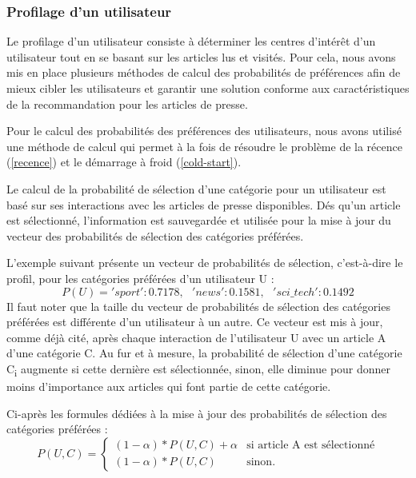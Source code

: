         \subsubsection{Profilage d'un utilisateur}\label{proba-selct}
        Le profilage d'un utilisateur consiste à déterminer les centres d'intérêt d'un utilisateur tout en se basant sur les articles lus et visités. Pour cela, nous avons mis en place plusieurs méthodes de calcul des probabilités de préférences afin de mieux cibler les utilisateurs et garantir une solution conforme aux caractéristiques de la recommandation pour les articles de presse. 

        Pour le calcul des probabilités des préférences des utilisateurs, nous avons utilisé une méthode de calcul qui permet à la fois de résoudre le problème de la récence (\autoref{recence}) et le démarrage à froid (\autoref{cold-start}).

        Le calcul de la probabilité de sélection d'une catégorie pour un utilisateur est basé sur ses interactions avec les articles de presse disponibles. Dés qu'un article est sélectionné, l'information est sauvegardée et utilisée pour la mise à jour du vecteur des probabilités de sélection des catégories préférées.

        L'exemple suivant présente un vecteur de probabilités de sélection, c'est-à-dire le profil, pour les catégories préférées d'un utilisateur U :
            \[P(U) = {'sport': 0.7178,\text{ }'news': 0.1581,\text{ }'sci\_tech': 0.1492}\]            
        Il faut noter que la taille du vecteur de probabilités de sélection des catégories préférées est différente d'un utilisateur à un autre. Ce vecteur est mis à jour, comme déjà cité, après chaque interaction de l'utilisateur U avec un article A d'une catégorie C. Au fur et à mesure, la probabilité de sélection d'une catégorie C\textsubscript{i} augmente si cette dernière est sélectionnée, sinon, elle diminue pour donner moins d'importance aux articles qui font partie de cette catégorie.

        Ci-après les formules dédiées à la mise à jour des probabilités de sélection des catégories préférées :\\
            \[
            P(U, C) =
            \begin{cases}
                (1-{\alpha}) * {P(U, C)} + {\alpha} & \text{si } \text{article A est sélectionné} \\
                (1-{\alpha}) * {P(U, C)} & \text{sinon.}
            \end{cases}
            \]

